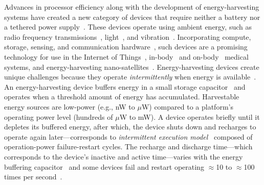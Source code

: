 Advances in processor efficiency along with the development of
energy-harvesting systems have created a new category of devices that require
neither a battery nor a tethered power
supply~\cite{prasad_comst_2014,lucia_snapl_2017,soyata_csm_2016}. These
devices operate using ambient energy, such as radio frequency
transmissions~\cite{rf_powered_computing_gollakota_2014},
light~\cite{margolies_infocom_2016,margolies_tosn_2016}, and
vibration~\cite{gorlatova_sigmetrics_2014}. Incorporating compute, storage,
sensing, and communication hardware~\cite{wisp5,moo,capybara}, such devices are a
promising technology for use in the Internet of Things~\cite{ku_cst_2016},
in-body~\cite{nadeau_naturebio_2017} and
on-body~\cite{bandodkar_electroanalysis_2015} medical systems, and
energy-harvesting nano-satellites~\cite{kicksat,capybara}.
%
Energy-harvesting devices create unique challenges because they operate {\em
intermittently} when energy is
available~\cite{hicks_isca_2017,lucia_snapl_2017}. An energy-harvesting device
buffers energy in a small storage capacitor~\cite{gorlatova_tmc_2013,gunduz_commag_2014} and operates when a
threshold amount of energy has accumulated. Harvestable energy sources are low-power (e.g., nW to $\mu$W) compared to a platform's operating
power level (hundreds of $\mu$W to mW). A device operates briefly until it depletes its buffered energy, after which, the device shuts
down and recharges to operate again later---corresponds to {\em intermittent execution model}~\cite{dino,lucia_snapl_2017} composed of
operation-power failure-restart cycles. 
The recharge and discharge time---which corresponds to the device's inactive and active time---varies with the energy buffering capacitor~\cite{capybara} and some devices fail and restart operating $\approx$10 to
$\approx$100 times per second~\cite{tan_infocom_2016,mementos,nvp}.
%

